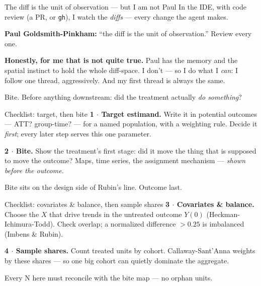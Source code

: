\documentclass[aspectratio=169,11pt]{beamer}
\begin{document}
\begin{frame}{The diff is the unit of observation --- but I am not Paul}
In the IDE, with code review (a PR, or \texttt{gh}), I watch the \emph{diffs} --- every change the agent makes.
\vspace{0.25cm}

\textbf{Paul Goldsmith-Pinkham:} ``the diff is the unit of observation.'' Review every one.
\vspace{0.25cm}

\textbf{Honestly, for me that is not quite true.} Paul has the memory and the spatial instinct to hold the whole diff-space. I don't --- so I do what I \emph{can}: I follow one thread, aggressively. And my first thread is always the same.
\vspace{0.15cm}

\alert{Bite. Before anything downstream: did the treatment actually \emph{do something}?}
\end{frame}

\begin{frame}{Checklist: target, then bite}
\textbf{1 $\cdot$ Target estimand.} Write it in potential outcomes --- ATT? group-time? --- for a named population, with a weighting rule. Decide it \emph{first}; every later step serves this one parameter.
\vspace{0.4cm}

\textbf{2 $\cdot$ Bite.} Show the treatment's first stage: did it move the thing that is supposed to move the outcome? Maps, time series, the assignment mechanism --- \emph{shown before the outcome.}
\vspace{0.3cm}

\alert{Bite sits on the design side of Rubin's line. Outcome last.}
\end{frame}

\begin{frame}{Checklist: covariates \& balance, then sample shares}
\textbf{3 $\cdot$ Covariates \& balance.} Choose the $X$ that drive trends in the untreated outcome $Y(0)$ (Heckman-Ichimura-Todd). Check overlap; a normalized difference $>0.25$ is imbalanced (Imbens \& Rubin).
\vspace{0.4cm}

\textbf{4 $\cdot$ Sample shares.} Count treated units by cohort. Callaway-Sant'Anna weights by these shares --- so one big cohort can quietly dominate the aggregate.
\vspace{0.3cm}

\alert{Every N here must reconcile with the bite map --- no orphan units.}
\end{frame}
\end{document}
